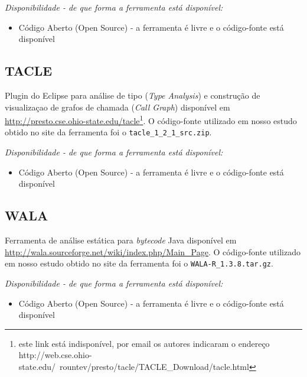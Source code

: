 \begin{description}

  \item {\it Disponibilidade - de que forma a ferramenta está disponível:}
    \begin{itemize}
      \item Código Aberto (Open Source) - a ferramenta é livre e o código-fonte está disponível
    \end{itemize}

\end{description}

\subsection{TACLE}

Plugin do Eclipse para análise de tipo ({\it Type Analysis}) e
construção de visualizaçao de grafos de chamada ({\it Call Graph}) disponível em
\url{http://presto.cse.ohio-state.edu/tacle}\footnote{este link está
indisponível, por email os autores indicaram o endereço
http://web.cse.ohio-state.edu/~rountev/presto/tacle/TACLE\_Download/tacle.html}.
O código-fonte utilizado em nosso estudo obtido no site da ferramenta foi o
\texttt{tacle\_1\_2\_1\_src.zip}.

\begin{description}

  \item {\it Disponibilidade - de que forma a ferramenta está disponível:}
    \begin{itemize}
      \item Código Aberto (Open Source) - a ferramenta é livre e o código-fonte está disponível
    \end{itemize}

\end{description}

\subsection{WALA}

Ferramenta de análise estática para {\it bytecode} Java disponível em
\url{http://wala.sourceforge.net/wiki/index.php/Main_Page}. O código-fonte
utilizado em nosso estudo obtido no site da ferramenta foi o
\texttt{WALA-R\_1.3.8.tar.gz}.

\begin{description}

  \item {\it Disponibilidade - de que forma a ferramenta está disponível:}
    \begin{itemize}
      \item Código Aberto (Open Source) - a ferramenta é livre e o código-fonte está disponível
    \end{itemize}

\end{description}

